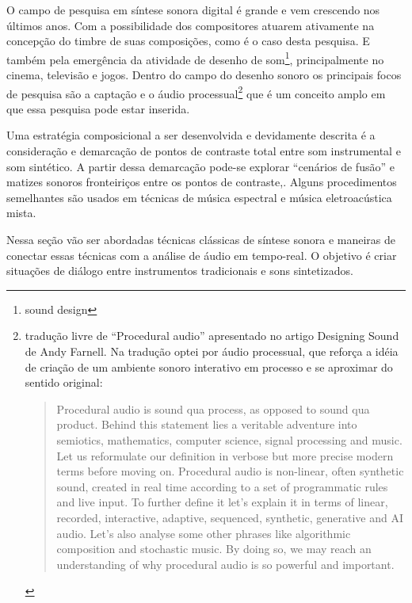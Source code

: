 \documentclass{ppgmus}
\begin{document}
O campo de pesquisa em síntese sonora digital é grande e vem crescendo
nos últimos anos. Com a possibilidade dos compositores atuarem ativamente
na concepção do timbre de suas composições, como é o caso desta pesquisa. E
também pela emergência da atividade de desenho  de som\footnote{sound design}, 
principalmente no cinema, televisão e jogos. Dentro do campo do desenho
sonoro os principais focos de pesquisa são a captação e o áudio
processual\footnote{tradução livre de ``Procedural audio'' apresentado no artigo
 Designing Sound de Andy Farnell\cite{farnell2010designing}. Na tradução optei por
áudio processual, que reforça a idéia de criação de um ambiente sonoro interativo
em processo e se aproximar do sentido original:

\begin{quote}
 Procedural audio is sound qua process, as opposed to sound qua product. Behind this statement lies 
a veritable adventure into semiotics, mathematics, computer science, signal processing and music. 
Let us reformulate our definition in verbose but more precise modern terms before moving on. 
Procedural audio is non-linear, often synthetic sound, created in real time according to a set 
of programmatic rules and live input. To further define it let's explain it in terms of linear, 
recorded, interactive, adaptive, sequenced, synthetic, generative and AI audio. 
Let's also analyse some other phrases like algorithmic composition and stochastic music. 
By doing so, we may reach an understanding of why procedural audio is so powerful and important.
\end{quote} 
} que é um conceito amplo em que essa pesquisa pode estar inserida. 

Uma estratégia composicional a ser desenvolvida e devidamente
descrita é a consideração e demarcação de pontos de contraste total
entre som instrumental e som sintético. A partir dessa demarcação pode-se
explorar ``cenários de fusão'' e matizes sonoros fronteiriços entre
os pontos de contraste,. Alguns procedimentos semelhantes são usados
em técnicas de música espectral e música eletroacústica mista.

Nessa seção vão ser abordadas técnicas clássicas de síntese sonora
e maneiras de conectar essas técnicas com a análise
de áudio em tempo-real. O objetivo é criar situações
de diálogo entre instrumentos tradicionais e sons sintetizados.
\end{document}
